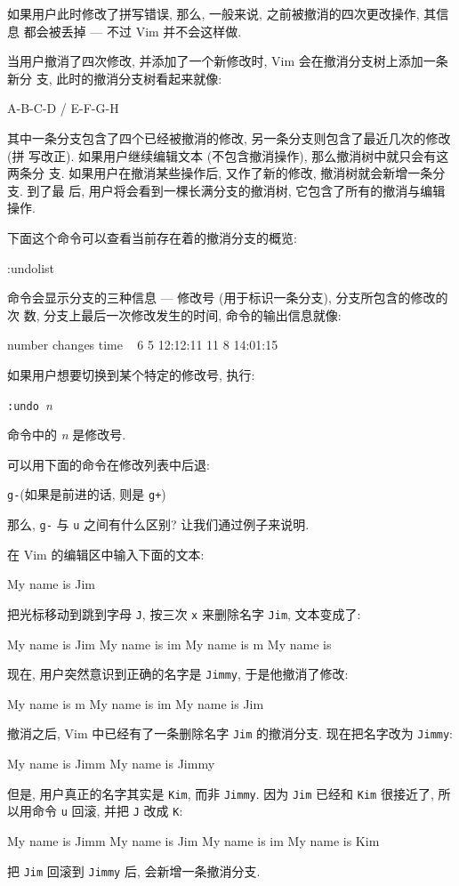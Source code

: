 如果用户此时修改了拼写错误, 那么, 一般来说, 之前被撤消的四次更改操作, 其信息
都会被丢掉 --- 不过 Vim 并不会这样做.

当用户撤消了四次修改, 并添加了一个新修改时, Vim 会在撤消分支树上添加一条新分
支, 此时的撤消分支树看起来就像:
\begin{vimcode}
        A-B-C-D
        /
    E-F-G-H
\end{vimcode}

其中一条分支包含了四个已经被撤消的修改, 另一条分支则包含了最近几次的修改 (拼
写改正). 如果用户继续编辑文本 (不包含撤消操作), 那么撤消树中就只会有这两条分
支. 如果用户在撤消某些操作后, 又作了新的修改, 撤消树就会新增一条分支. 到了最
后, 用户将会看到一棵长满分支的撤消树, 它包含了所有的撤消与编辑操作.

下面这个命令可以查看当前存在着的撤消分支的概览:
\begin{vimcode}
:undolist
\end{vimcode}
命令会显示分支的三种信息 --- 修改号 (用于标识一条分支), 分支所包含的修改的次
数, 分支上最后一次修改发生的时间, 命令的输出信息就像:
\begin{vimcode}
number  changes time ~
6       5       12:12:11
11      8       14:01:15
\end{vimcode}

如果用户想要切换到某个特定的修改号, 执行:
\begin{vimcmdform}
\texttt{:undo }\textit{n}
\end{vimcmdform}
命令中的 \textit{n} 是修改号.

可以用下面的命令在修改列表中后退:
\begin{vimcmdform}
    \texttt{g-}(如果是前进的话, 则是 \texttt{g+})
\end{vimcmdform}

那么, \texttt{g-} 与 \texttt{u} 之间有什么区别? 让我们通过例子来说明.

在 Vim 的编辑区中输入下面的文本:
\begin{vimcode}
My name is Jim
\end{vimcode}
把光标移动到跳到字母 \texttt{J}, 按三次 \texttt{x} 来删除名字 \texttt{Jim},
文本变成了:
\begin{vimcode}
My name is Jim
My name is im
My name is m
My name is 
\end{vimcode}
现在, 用户突然意识到正确的名字是 \texttt{Jimmy}, 于是他撤消了修改:
\begin{vimcode}
My name is m
My name is im
My name is Jim
\end{vimcode}
撤消之后, Vim 中已经有了一条删除名字 \texttt{Jim} 的撤消分支. 现在把名字改为
\texttt{Jimmy}:
\begin{vimcode}
My name is Jimm
My name is Jimmy
\end{vimcode}
但是, 用户真正的名字其实是 \texttt{Kim}, 而非 \texttt{Jimmy}. 因为 \texttt{Jim}
已经和 \texttt{Kim} 很接近了, 所以用命令 \texttt{u} 回滚, 并把 \texttt{J} 改成
\texttt{K}:
\begin{vimcode}
My name is Jimm
My name is Jim
My name is im
My name is Kim
\end{vimcode}
把 \texttt{Jim} 回滚到 \texttt{Jimmy} 后, 会新增一条撤消分支.

